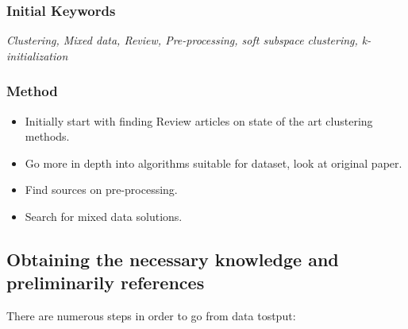 \documentclass[a4paper,11pt]{article}
\begin{document}
\subsubsection{Initial Keywords}

\textit{Clustering, Mixed data, Review, Pre-processing, soft subspace clustering, k-initialization}

\subsubsection{Method}

\begin{itemize}
\item
  Initially start with finding Review articles on state of the art
  clustering methods.
\item
  Go more in depth into algorithms suitable for dataset, look at
  original paper.
\item
  Find sources on pre-processing.
\item
  Search for mixed data solutions.
\end{itemize}

\subsection{Obtaining the necessary knowledge and preliminarily
references}

There are numerous steps in order to go from data tostput:
\end{document}
